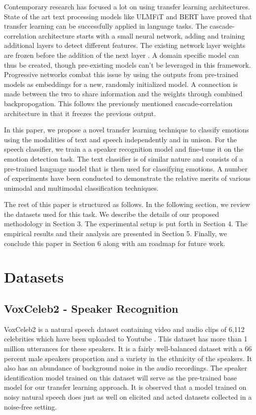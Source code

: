 \documentclass{article}
\begin{document}
Contemporary research has focused a lot on using transfer learning architectures. State of the art text processing models like ULMFiT \cite{ulmfit} and BERT \cite{bert} have proved that transfer learning can be successfully applied in language tasks. The cascade-correlation architecture starts with a small neural network, adding and training additional layers to detect different features. The existing network layer weights are frozen before the addition of the next layer \cite{casc-corr}. A domain specific model can thus be created, though pre-existing models can't be leveraged in this framework. Progressive networks \cite{progressive} combat this issue by using the outputs from pre-trained models as embeddings for a new, randomly initialized model. A connection is made between the two to share information and the weights through combined backpropogation. This follows the previously mentioned cascade-correlation architecture in that it freezes the previous output.

In this paper, we propose a novel transfer learning technique to classify emotions using the modalities of text and speech independently and in unison. For the speech classifier, we train a a speaker recognition model and fine-tune it on the emotion detection task. The text classifier is of similar nature and consists of a pre-trained language model that is then used for classifying emotions. A number of experiments have been conducted to demonstrate the relative merits of various unimodal and multimodal classification techniques.

The rest of this paper is structured as follows. In the following section, we review the datasets used for this task. We describe the details of our proposed methodology in Section 3. The experimental setup is put forth in Section 4. The empirical results and their analysis are presented in Section 5. Finally, we conclude this paper in Section 6 along with am roadmap for future work.

\section{Datasets}

\subsection{VoxCeleb2 - Speaker Recognition}

VoxCeleb2 is a natural speech dataset containing video and audio clips of 6,112 celebrities which have been uploaded to Youtube \cite{voxceleb}. This dataset has more than 1 million utterances for these speakers. It is a fairly well-balanced dataset with a 66 percent male speakers proportion and a variety in the ethnicity of the speakers. It also has an abundance of background noise in the audio recordings. The speaker identification model trained on this dataset will serve as the pre-trained base model for our transfer learning approach. It is observed that a model trained on noisy natural speech does just as well on elicited and acted datasets collected in a noise-free setting.
\end{document}
